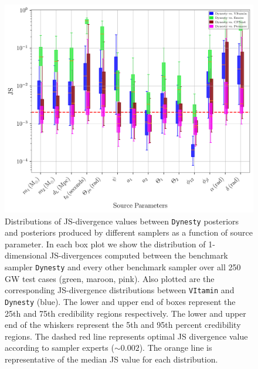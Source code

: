 %
\begin{figure}
    \includegraphics[width=\textwidth]{JS_IndiPar_dynesty.png}
    \caption{\label{fig:kl_results} Distributions of \ac{JS}-divergence values between 
    \texttt{Dynesty} posteriors and posteriors produced by different samplers 
    as a function 
    of source parameter. In each box plot we show the distribution of 1-dimensional 
     \ac{JS}-divergences computed between the benchmark sampler \texttt{Dynesty} 
     and every other benchmark sampler over all 250 \ac{GW} test cases 
     (green, maroon, pink). Also plotted are the corresponding 
     \ac{JS}-divergence distributions between \texttt{VItamin} and \texttt{Dynesty} 
     (blue). The lower and upper end of boxes represent the 25th and 75th credibility
      regions respectively. The lower and upper end of the whiskers represent the 5th 
      and 95th percent credibility regions. The dashed red line represents optimal JS divergence value according to sampler experts ($\sim 0.002$). 
      The orange line is representative of the median JS value for each distribution. 
      }

\end{figure}
%

